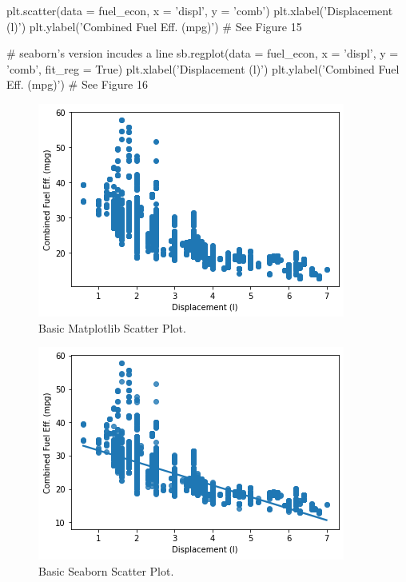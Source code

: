 \begin{python}
	plt.scatter(data = fuel_econ, x = 'displ', y = 'comb')
	plt.xlabel('Displacement (l)')
	plt.ylabel('Combined Fuel Eff. (mpg)')
	# See Figure 15
	
	# seaborn's version incudes a line
	sb.regplot(data = fuel_econ, x = 'displ', y = 'comb', fit_reg = True)
	plt.xlabel('Displacement (l)')
	plt.ylabel('Combined Fuel Eff. (mpg)')
	# See Figure 16
\end{python}

\begin{figure}
	\includegraphics{images/figure15.png}
	\caption{Basic Matplotlib Scatter Plot.}\label{fig:figure15}
\end{figure}

\begin{figure}
	\includegraphics{images/figure16.png}
	\caption{Basic Seaborn Scatter Plot.}\label{fig:figure16}
\end{figure}